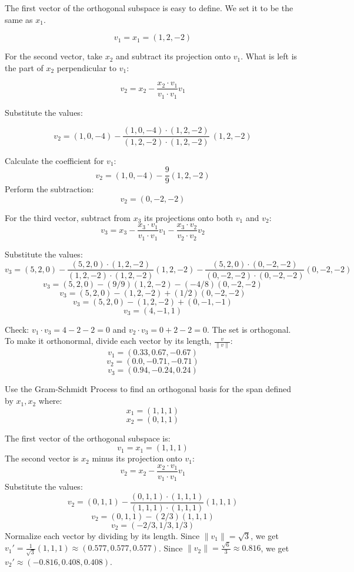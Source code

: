 The first vector of the orthogonal subspace is easy to define. We set it to be the same as $x_1$.

$$v_1 = x_1 = (1, 2, -2)$$

For the second vector, take $x_2$ and subtract its projection onto $v_1$.
What is left is the part of $x_2$ perpendicular to $v_1$:

$$v_2 = x_2 - \frac{x_2 \cdot v_1}{v_1 \cdot v_1} v_1$$

Substitute the values:

$$v_2 = (1, 0, -4)  - \frac{(1,0, -4)\cdot(1,2,-2)}{(1,2,-2)\cdot(1,2,-2)} \ (1, 2, -2) $$

Calculate the coefficient for $v_1$:
$$v_2 = (1, 0, -4) - \frac{9}{9} (1, 2, -2)$$
Perform the subtraction:
$$v_2 = (0, -2, -2)$$
 
For the third vector, subtract from $x_3$ its projections onto both $v_1$ and $v_2$:
$$v_3 = x_3 - \frac{x_3 \cdot v_1}{v_1 \cdot v_1} v_1 - \frac{x_3 \cdot v_2}{v_2 \cdot v_2} v_2$$

Substitute the values:
$$v_3 = (5,2,0) - \frac{(5,2,0)\cdot(1,2,-2)}{(1,2,-2)\cdot(1,2,-2)} (1,2,-2) - \frac{(5,2,0)\cdot(0,-2,-2)}{(0,-2,-2)\cdot(0,-2,-2)} (0,-2,-2)$$
$$v_3 =  (5,2,0)  - (9/9) (1,2,-2) -  (-4/8)(0,-2,-2)$$
$$v_3 =  (5,2,0) - (1,2,-2) + (1/2)(0,-2,-2)$$
$$v_3  = (5,2,0 ) - (1,2,-2) + (0,-1,-1)$$
$$v_3 = (4, -1, 1)$$

Check: $v_1 \cdot v_3 = 4 - 2 - 2 = 0$ and $v_2 \cdot v_3 = 0 + 2 - 2 = 0$. The
set is orthogonal. To make it orthonormal, divide each vector by its
length, $\frac{v}{\|v\|}$:
$$v_1 = (0.33,  0.67, -0.67)$$
$$v_2 = (0.0,  -0.71, -0.71 )$$
$$v_3 = (0.94, -0.24,  0.24 ) $$

\begin{Exercise}[title={Gram-Schmidt Process}, label=gram_schmidt]
    Use the Gram-Schmidt Process to find an orthogonal basis for the span defined by $x_1, x_2$ where:
    $$x_1 = (1, 1, 1)$$
	$$x_2 = (0, 1, 1) $$
\end{Exercise}
\begin{Answer}[ref=gram_schmidt]
      The first vector of the orthogonal subspace is: 
		$$v_1 = x_1 =  (1, 1, 1) $$ 
	  The second vector is $x_2$ minus its projection onto $v_1$:
	  $$v_2 = x_2 - \frac{x_2 \cdot v_1}{v_1 \cdot v_1} v_1$$
	  Substitute the values:
	  $$v_2 =  (0, 1, 1)  - \frac{(0,1, 1)\cdot(1,1,1)}{(1,1,1)\cdot(1,1,1)}  (1, 1, 1)$$
	  $$v_2 =  (0, 1, 1)  - (2/3) (1, 1, 1) $$
	  $$v_2 =  (-2/3, 1/3, 1/3)$$
	  Normalize each vector by dividing by its length. Since $\|v_1\| = \sqrt{3}$, we get $v_1' = \frac{1}{\sqrt{3}}(1, 1, 1) \approx (0.577, 0.577, 0.577)$. Since $\|v_2\| = \frac{\sqrt{6}}{3} \approx 0.816$, we get $v_2' \approx (-0.816, 0.408, 0.408)$.
\end{Answer}

